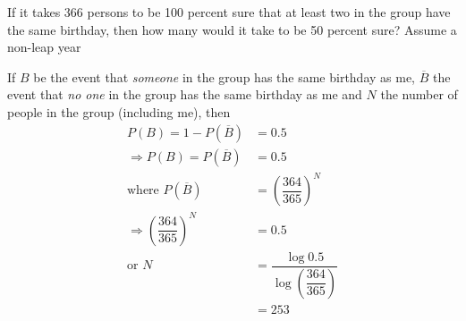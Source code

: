 

\question If it takes 366 persons to be 100 percent sure that at least two in the group
have the same birthday, then how many would it take to be 50 percent sure? Assume a non-leap year


\ifprintanswers
\fi 

\begin{solution}
   If $B$ be the event that \textit{someone} in the group has the same birthday as me,
   $\overline{B}$ the event that \textit{no one} in the group has the same
   birthday as me and $N$ the number of people in the group (including me), then 
   \begin{align}
     P(B) = 1 - P(\overline{B}) &= 0.5 \\
     \Rightarrow P(B) = P(\overline{B}) &= 0.5 \\
     \text{where } P(\overline{B}) &= \left(\dfrac{364}{365}\right)^N \\
     \Rightarrow \left(\dfrac{364}{365}\right)^N &= 0.5 \\
     \text{or } N &= \dfrac{\log 0.5}{\log\left(\dfrac{364}{365}\right)} \\
       &= 253
   \end{align} 
\end{solution}
